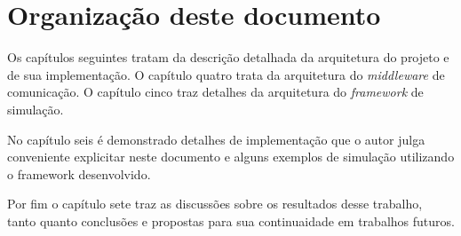 \section{Organização deste documento}

Os capítulos seguintes tratam da descrição detalhada da arquitetura do projeto e de sua implementação. O capítulo quatro trata da arquitetura do \textit{middleware} de comunicação. O capítulo cinco traz detalhes da arquitetura do \textit{framework} de simulação.

No capítulo seis é demonstrado detalhes de implementação que o autor julga conveniente explicitar neste documento e  alguns exemplos de simulação utilizando o framework desenvolvido.

Por fim o capítulo sete traz as discussões sobre os resultados desse trabalho, tanto quanto conclusões e propostas para sua continuaidade em trabalhos futuros.

